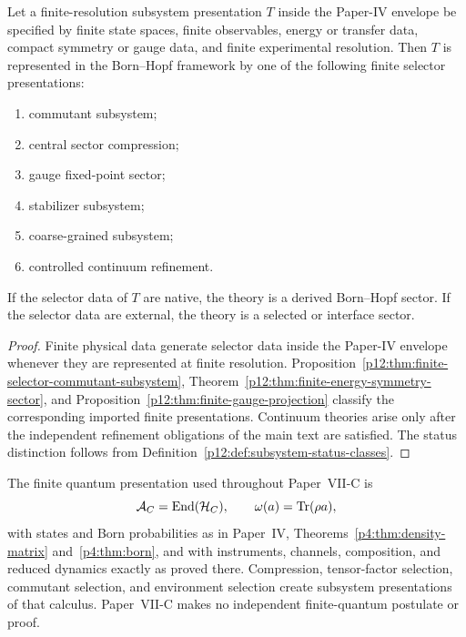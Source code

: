 \documentclass[12pt,a4paper]{article}
\begin{document}
\begin{theorem}
\label{p12:thm:theory-subsystem-classification}
Let a finite-resolution subsystem presentation \(T\) inside the Paper-IV envelope be specified by finite state spaces, finite observables, energy or transfer data, compact symmetry or gauge data, and finite experimental resolution.  Then \(T\) is represented in the Born--Hopf framework by one of the following finite selector presentations:
\begin{enumerate}[label=(\roman*), leftmargin=2em]
\item commutant subsystem;
\item central sector compression;
\item gauge fixed-point sector;
\item stabilizer subsystem;
\item coarse-grained subsystem;
\item controlled continuum refinement.
\end{enumerate}
If the selector data of \(T\) are native, the theory is a derived Born--Hopf sector.  If the selector data are external, the theory is a selected or interface sector.
\end{theorem}

\begin{proof}
Finite physical data generate selector data inside the Paper-IV envelope whenever they are represented at finite resolution.  Proposition~\ref{p12:thm:finite-selector-commutant-subsystem}, Theorem~\ref{p12:thm:finite-energy-symmetry-sector}, and Proposition~\ref{p12:thm:finite-gauge-projection} classify the corresponding imported finite presentations.  Continuum theories arise only after the independent refinement obligations of the main text are satisfied.  The status distinction follows from Definition~\ref{p12:def:subsystem-status-classes}.
\end{proof}

\begin{remark}
\label{p12:prop:qm-subsystem}
The finite quantum presentation used throughout Paper~VII-C is
\[
\mathcal A_C=\operatorname{End}(\mathcal H_C),
\qquad
\omega(a)=\operatorname{Tr}(\rho a),
\]
with states and Born probabilities as in Paper~IV, Theorems~\ref{p4:thm:density-matrix} and~\ref{p4:thm:born}, and with instruments, channels, composition,
and reduced dynamics exactly as proved there.  Compression,
tensor-factor selection, commutant selection, and environment selection create
subsystem presentations of that calculus.  Paper~VII-C makes no independent
finite-quantum postulate or proof.
\end{remark}
\end{document}
